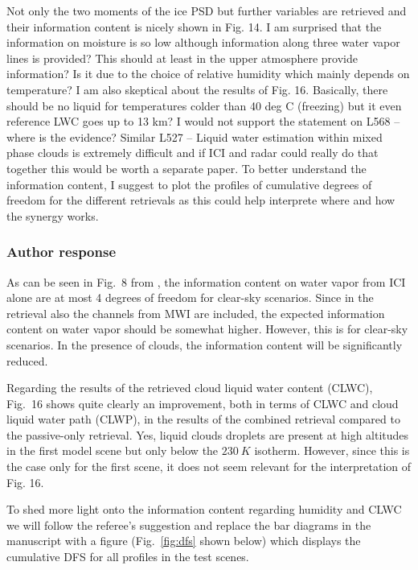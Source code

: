 \documentclass[11pt]{scrartcl}
\begin{document}
Not only the two moments of the ice PSD but further variables are retrieved and
their information content is nicely shown in Fig. 14. I am surprised that the
information on moisture is so low although information along three water vapor
lines is provided? This should at least in the upper atmosphere provide
information? Is it due to the choice of relative humidity which mainly depends
on temperature? I am also skeptical about the results of Fig. 16. Basically,
there should be no liquid for temperatures colder than 40 deg C (freezing) but
it even reference LWC goes up to 13 km? I would not support the statement on
L568 – where is the evidence? Similar L527 – Liquid water estimation within
mixed phase clouds is extremely difficult and if ICI and radar could really do
that together this would be worth a separate paper. To better understand the
information content, I suggest to plot the profiles of cumulative degrees of
freedom for the different retrievals as this could help interprete where and how
the synergy works.

\subsubsection*{Author response}

As can be seen in Fig.~8 from \cite{eriksson19}, the information content on
water vapor from ICI alone are at most 4 degrees of freedom for clear-sky
scenarios. Since in the retrieval also the channels from MWI are included, the
expected information content on water vapor should be somewhat higher. However,
this is for clear-sky scenarios. In the presence of clouds, the information
content will be significantly reduced.

Regarding the results of the retrieved cloud liquid water content (CLWC),
Fig.~16 shows quite clearly an improvement, both in terms of CLWC and cloud
liquid water path (CLWP), in the results of the combined retrieval compared to
the passive-only retrieval. Yes, liquid clouds droplets are present at high
altitudes in the first model scene but only below the $230\ \unit{K}$ isotherm.
However, since this is the case only for the first scene, it does not seem
relevant for the interpretation of Fig. 16.

To shed more light onto the information content regarding humidity and CLWC we
will follow the referee's suggestion and replace the bar diagrams in the
manuscript with a figure (Fig.~\ref{fig:dfs} shown below) which displays the
cumulative DFS for all profiles in the test scenes.
\end{document}
